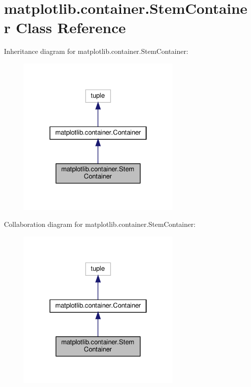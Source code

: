 \hypertarget{classmatplotlib_1_1container_1_1StemContainer}{}\section{matplotlib.\+container.\+Stem\+Container Class Reference}
\label{classmatplotlib_1_1container_1_1StemContainer}


Inheritance diagram for matplotlib.\+container.\+Stem\+Container\+:
\nopagebreak
\begin{figure}[H]
\begin{center}
\leavevmode
\includegraphics[width=226pt]{classmatplotlib_1_1container_1_1StemContainer__inherit__graph}
\end{center}
\end{figure}


Collaboration diagram for matplotlib.\+container.\+Stem\+Container\+:
\nopagebreak
\begin{figure}[H]
\begin{center}
\leavevmode
\includegraphics[width=226pt]{classmatplotlib_1_1container_1_1StemContainer__coll__graph}
\end{center}
\end{figure}

